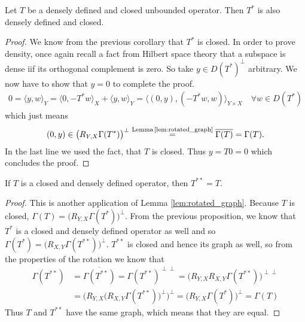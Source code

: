 \documentclass[../master_thesis.tex]{subfiles}
\begin{document}
\begin{proposition}\label{prop:adjoint_of_densely_defined_closed}
    Let $T$ be a densely defined and closed unbounded operator.
    Then $T^*$ is also densely defined and closed.
\end{proposition}
\begin{proof}
    We know from the previous corollary that $T^*$ is closed. 
    In order to prove density, once again recall a fact from Hilbert space
    theory that a subspace is dense iif its orthogonal complement 
    is zero. So take $y \in D(T^*)^\perp$ arbitrary. We now have to show that 
    $y=0$ to complete the proof.
    \begin{align*}
        0 = \langle y, w \rangle_Y 
        = \langle 0, -T^*w \rangle _X + \langle y, w \rangle _Y
        = \langle (0,y), (-T^*w,w) \rangle _{Y\times X} \quad \forall w \in D(T^*)
    \end{align*}
    which just means
    \begin{align*}
        (0,y) \in \big(R_{Y,X}\Gamma(T^*)\big)^\perp 
        \stackrel{\text{Lemma\,\ref{lem:rotated_graph}} }{=} \overline{\Gamma(T)}
        = \Gamma(T).
    \end{align*}
    In the last line we used the fact, that $T$ is closed. 
    Thus $y = T0 = 0$ which concludes the proof.
\end{proof}

\begin{proposition}\label{prop:T_starstar_equals_T}
    If $T$ is a closed and densely defined operator, 
    then $T^{**} = T$.
\end{proposition}
\begin{proof}
    This is another application of Lemma \ref{lem:rotated_graph}. 
    Because $T$ is closed, $\Gamma(T) = \big( R_{Y,X}\Gamma(T^*)\big)^\perp$. 
    From the previous proposition, we know that $T^*$ is a closed and 
    densely defined operator as well and so $\Gamma(T^*) = \big( R_{X,Y}\Gamma(T^{**})\big)^\perp$.
    $T^{**}$ is closed and hence its graph as well, so
    from the properties of the rotation we know that
    \begin{align*}
        \Gamma(T^{**}) 
        &= \overline{\Gamma(T^{**})} 
        = \Gamma(T^{**})^{\perp \perp}
        = \big( R_{Y,X} R_{X,Y}\Gamma(T^{**})   \big)^{\perp \perp}
        \\ &= \Big( R_{Y,X}\big(R_{X,Y}\Gamma(T^{**})\big)^{\perp} \Big)^\perp
        = \Big( R_{Y,X} \Gamma(T^*) \Big)^\perp
        = \Gamma(T)
    \end{align*}
    Thus $T$ and $T^{**}$ have the same graph, which means that they are equal.
\end{proof}
\end{document}
